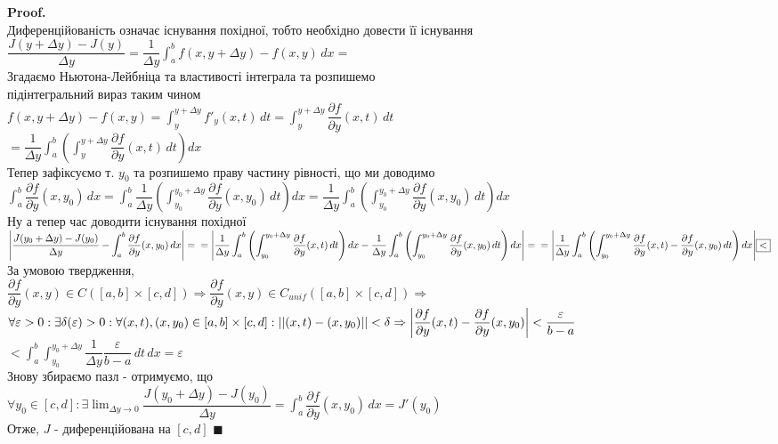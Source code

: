 \documentclass[a4paper, 14pt]{extarticle}
\def\departial#1#2{\dfrac{\partial {#1}}{\partial {#2}}}
\def\huge{\displaystyle}
\theoremstyle{theoremdd}
\theoremstyle{theoremdd}
\theoremstyle{theoremdd}
\theoremstyle{theoremdd}
\theoremstyle{theoremdd}
\theoremstyle{theoremdd}
\theoremstyle{theoremdd}
\newenvironment{pf}{\vspace*{-3mm} \textbf{Proof. \\}}{$\blacksquare$}
\begin{document}
\begin{pf}
Диференційованість означає існування похідної, тобто необхідно довести її існування\\
$\dfrac{J(y+\Delta y) - J(y)}{\Delta y} = \dfrac{1}{\Delta y} \huge \int_a^b f(x,y+\Delta y) - f(x,y)\,dx \boxed{=}$\\
Згадаємо Ньютона-Лейбніца та властивості інтеграла та розпишемо \\ підінтегральний вираз таким чином\\
$f(x,y+\Delta y) - f(x,y) = \huge\int_y^{y+\Delta y} f'_y(x,t)\,dt = \int_y^{y+\Delta y} \departial{f}{y}(x,t)\,dt$\\
$\boxed{=} \huge \dfrac{1}{\Delta y} \int_a^b \left( \int_y^{y+\Delta y} \departial{f}{y}(x,t)\,dt \right)dx$\\
Тепер зафіксуємо т. $y_0$ та розпишемо праву частину рівності, що ми доводимо\\
$\huge \int_a^b \departial{f}{y}(x,y_0)\,dx = \int_a^b \dfrac{1}{\Delta y} \left( \int_{y_0}^{y_0+\Delta y} \departial{f}{y}(x,y_0) \,dt \right)dx = \dfrac{1}{\Delta y} \int_a^b \left( \int_{y_0}^{y_0+\Delta y} \departial{f}{y}(x,y_0) \,dt \right)dx$\\
Ну а тепер час доводити існування похідної\\
$\huge \abs{\dfrac{J(y_0+\Delta y) - J(y_0)}{\Delta y} - \huge\int_a^b \departial{f}{y}(x,y_0)\,dx} = \\
= \abs{\dfrac{1}{\Delta y} \int_a^b \left( \int_{y_0}^{y_0+\Delta y} \departial{f}{y}(x,t)\,dt \right)dx - \dfrac{1}{\Delta y} \int_a^b \left( \int_{y_0}^{y_0+\Delta y} \departial{f}{y}(x,y_0) \,dt \right)dx} = \\
= \abs{\dfrac{1}{\Delta y} \int_a^b \left( \int_{y_0}^{y_0 + \Delta y} \departial{f}{y}(x,t) - \departial{f}{y}(x,y_0) \,dt \right)dx} \boxed{<}$\\
За умовою твердження, \\ $\departial{f}{y}(x,y) \in C([a,b] \times [c,d]) \Rightarrow \departial{f}{y}(x,y) \in C_{unif}([a,b] \times [c,d]) \Rightarrow$\\
$\forall \varepsilon > 0: \exists \delta(\varepsilon) > 0: \forall (x,t),(x,y_0) \in [a,b]\times [c,d]: ||(x,t)-(x,y_0)|| < \delta \Rightarrow \abs{\departial{f}{y}(x,t) - \departial{f}{y}(x,y_0)} < \dfrac{\varepsilon}{b-a}$\\
$\boxed{<} \huge\int_a^b \int_{y_0}^{y_0+\Delta y} \dfrac{1}{\Delta y} \dfrac{\varepsilon}{b-a} \,dt \,dx = \varepsilon$\\
Знову збираємо пазл - отримуємо, що\\
$\forall y_0 \in [c,d]: \exists \huge \lim_{\Delta y \to 0} \dfrac{J(y_0+\Delta y)-J(y_0)}{\Delta y} = \int_a^b \departial{f}{y}(x,y_0)\,dx = J'(y_0)$\\
Отже, $J$ - диференційована на $[c,d]$
\end{pf}
\end{document}
